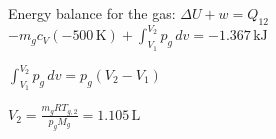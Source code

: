 Energy balance for the gas:  
\( \Delta U + w = Q_{12} \)  
\( -m_{g} c_{V} (-500 \, \text{K}) + \int_{V_1}^{V_2} p_{g} \, dv = -1.367 \, \text{kJ} \)  

\( \int_{V_1}^{V_2} p_{g} \, dv = p_{g} (V_2 - V_1) \)  

\( V_2 = \frac{m_{g} R T_{g,2}}{p_{g} M_{g}} = 1.105 \, \text{L} \)
